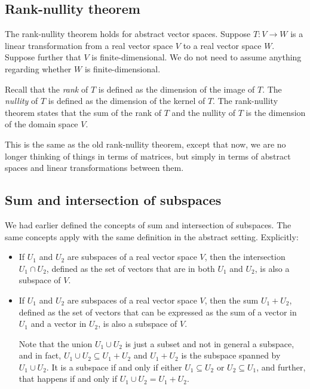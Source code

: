 \documentclass[10pt]{amsart}
\begin{document}
\subsection{Rank-nullity theorem}

The rank-nullity theorem holds for abstract vector spaces. Suppose
$T:V \to W$ is a linear transformation from a real vector space $V$ to
a real vector space $W$. Suppose further that $V$ is
finite-dimensional. We do not need to assume anything regarding
whether $W$ is finite-dimensional. 

Recall that the {\em rank} of $T$ is defined as the dimension of the
image of $T$. The {\em nullity} of $T$ is defined as the dimension of
the kernel of $T$. The rank-nullity theorem states that the sum of the
rank of $T$ and the nullity of $T$ is the dimension of the domain
space $V$.

This is the same as the old rank-nullity theorem, except that now, we
are no longer thinking of things in terms of matrices, but simply in
terms of abstract spaces and linear transformations between them.
\subsection{Sum and intersection of subspaces}

We had earlier defined the concepts of sum and intersection of
subspaces. The same concepts apply with the same definition in the
abstract setting. Explicitly:

\begin{itemize}
\item If $U_1$ and $U_2$ are subspaces of a real vector space $V$,
  then the intersection $U_1 \cap U_2$, defined as the set of vectors
  that are in both $U_1$ and $U_2$, is also a subspace of $V$.
\item If $U_1$ and $U_2$ are subspaces of a real vector space $V$,
  then the sum $U_1 + U_2$, defined as the set of vectors that can be
  expressed as the sum of a vector in $U_1$ and a vector in $U_2$, is
  also a subspace of $V$.

  Note that the union $U_1 \cup U_2$ is just a subset and not in
  general a subspace, and in fact, $U_1 \cup U_2 \subseteq U_1 + U_2$
  and $U_1 + U_2$ is the subspace spanned by $U_1 \cup U_2$. It is a
  subspace if and only if either $U_1 \subseteq U_2$ or $U_2 \subseteq
  U_1$, and further, that happens if and only if $U_1 \cup U_2 = U_1 +
  U_2$.
\end{itemize}
\end{document}
